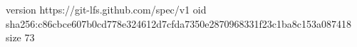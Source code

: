 version https://git-lfs.github.com/spec/v1
oid sha256:c86cbce607b0cd778e324612d7cfda7350e2870968331f23c1ba8c153a087418
size 73
